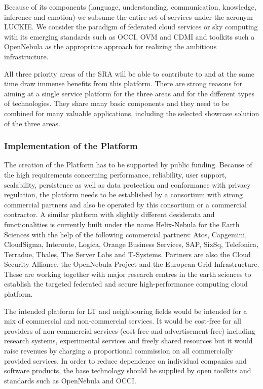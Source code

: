 \documentclass[10pt, plain]{../../metanetpaper}
\begin{document}
\begin{multicols}{2}
Because of its components (language, understanding, communi­cation, know­ledge, inference and emotion) we subsume the entire set of services under the acronym LUCKIE.  We consider the paradigm of federated cloud services or sky computing with its emerging standards such as OCCI, OVM and CDMI and toolkits such a OpenNebula as the appropriate approach for realizing the ambitious infrastructure.  
 
All three priority areas of the SRA will be able to contribute to and at the same time draw immense benefits from this platform. There are strong reasons for aiming at a single service platform for the three areas and for the different types of technologies. They share many basic components and they need to be combined for many valuable applications, including the selected showcase solution of the three areas.

\subsubsection{Implementation of the Platform}
\label{sec:implementation-of-platform}

The creation of the Platform has to be supported by public funding. Because of the high requirements concerning performance, reliability, user support, scalability, persistence as well as data protection and conformance with privacy regulation, the platform needs to be established by a consortium with strong commercial partners and also be operated by this consortium or a commercial contractor. A similar platform with slightly different desiderata and functionalities is currently built under the name Helix-Nebula for the Earth Sciences with the help of the following commercial partners: Atos, Capgemini, CloudSigma, Interoute, Logica, Orange Business Services, SAP, SixSq, Telefonica, Terradue, Thales, The Server Labs and T-Systems. Partners are also the Cloud Security Alliance, the OpenNebula Project and the European Grid Infrastructure. These are working together with major research centres in the earth sciences to establish the targeted federated and secure high-performance computing cloud platform.
 
The intended platform for LT and neighbouring fields would be intended for a mix of commercial and non-commercial services. It would be cost-free for all providers of non-commercial services (cost-free and advertisement-free) including research systems, experimental services and freely shared resources but it would raise revenues by charging a proportional commission on all commercially provided services.  In order to reduce dependence on individual companies and software products, the base technology should be supplied by open toolkits and standards such as OpenNebula and OCCI.  
 

\end{multicols}
\end{document}
